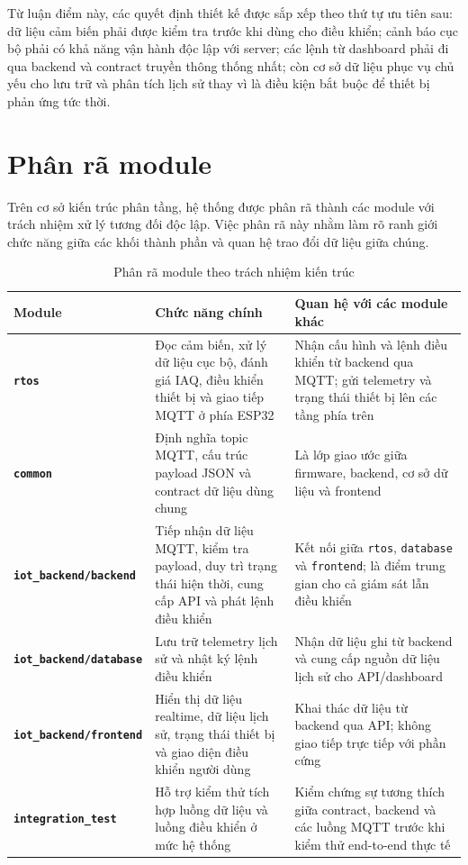 Từ luận điểm này, các quyết định thiết kế được sắp xếp theo thứ tự ưu tiên sau: dữ
liệu cảm biến phải được kiểm tra trước khi dùng cho điều khiển; cảnh báo cục bộ phải có
khả năng vận hành độc lập với server; các lệnh từ dashboard phải đi qua backend và
contract truyền thông thống nhất; còn cơ sở dữ liệu phục vụ chủ yếu cho lưu trữ và phân
tích lịch sử thay vì là điều kiện bắt buộc để thiết bị phản ứng tức thời.

\section{Phân rã module}

Trên cơ sở kiến trúc phân tầng, hệ thống được phân rã thành các module với trách nhiệm
xử lý tương đối độc lập. Việc phân rã này nhằm làm rõ ranh giới chức năng giữa các khối
thành phần và quan hệ trao đổi dữ liệu giữa chúng.

\begin{table}[H]
    \centering
    \caption{Phân rã module theo trách nhiệm kiến trúc}
    \begin{tabularx}{\textwidth}{>{\bfseries}l X X}
        \toprule
        Module & Chức năng chính & Quan hệ với các module khác \\
        \midrule
        \texttt{rtos} & Đọc cảm biến, xử lý dữ liệu cục bộ, đánh giá IAQ, điều khiển thiết bị và giao tiếp MQTT ở phía ESP32 & Nhận cấu hình và lệnh điều khiển từ backend qua MQTT; gửi telemetry và trạng thái thiết bị lên các tầng phía trên \\
        \texttt{common} & Định nghĩa topic MQTT, cấu trúc payload JSON và contract dữ liệu dùng chung & Là lớp giao ước giữa firmware, backend, cơ sở dữ liệu và frontend \\
        \texttt{iot\_backend/backend} & Tiếp nhận dữ liệu MQTT, kiểm tra payload, duy trì trạng thái hiện thời, cung cấp API và phát lệnh điều khiển & Kết nối giữa \texttt{rtos}, \texttt{database} và \texttt{frontend}; là điểm trung gian cho cả giám sát lẫn điều khiển \\
        \texttt{iot\_backend/database} & Lưu trữ telemetry lịch sử và nhật ký lệnh điều khiển & Nhận dữ liệu ghi từ backend và cung cấp nguồn dữ liệu lịch sử cho API/dashboard \\
        \texttt{iot\_backend/frontend} & Hiển thị dữ liệu realtime, dữ liệu lịch sử, trạng thái thiết bị và giao diện điều khiển người dùng & Khai thác dữ liệu từ backend qua API; không giao tiếp trực tiếp với phần cứng \\
        \texttt{integration\_test} & Hỗ trợ kiểm thử tích hợp luồng dữ liệu và luồng điều khiển ở mức hệ thống & Kiểm chứng sự tương thích giữa contract, backend và các luồng MQTT trước khi kiểm thử end-to-end thực tế \\
        \bottomrule
    \end{tabularx}
\end{table}

